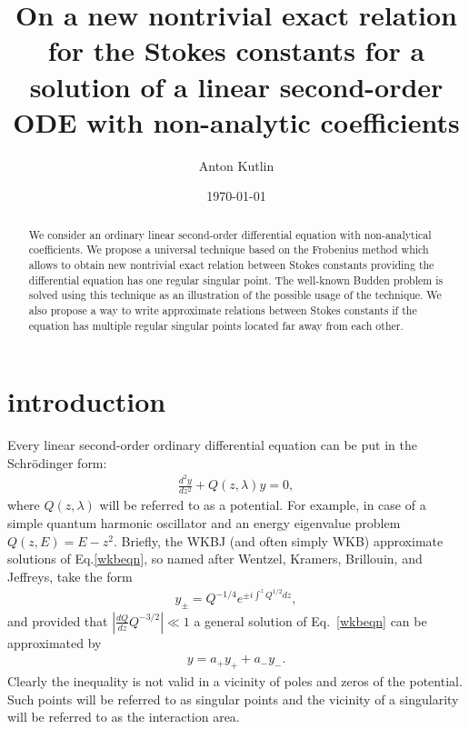 \documentclass[aip,jmp,reprint]{revtex4-1}
\begin{document}
\title{On a new nontrivial exact relation for the Stokes constants for a solution of 
a linear second-order ODE with non-analytic coefficients}
\author{Anton Kutlin}

\date{\today}

\begin{abstract}
We consider an ordinary linear second-order differential equation with non-analytical coefficients.
We propose a universal technique based on the Frobenius method which allows to obtain new nontrivial 
exact relation between Stokes constants providing the differential equation has one regular singular point.
The well-known Budden problem is solved using this technique as an illustration of the possible usage
of the technique. We also propose a way to write approximate relations between Stokes constants 
if the equation has multiple regular singular points located far away from each other.
\end{abstract}


\maketitle

\section{introduction \label{intro}}
Every linear second-order ordinary differential equation can be put in the Schr\"odinger form:
\begin{eqnarray}
\frac{d^2y}{dz^2} + Q(z,\lambda)y = 0,   \label{wkbeqn}
\end{eqnarray}
where \mbox{$Q(z,\lambda)$} will be referred to as a potential. For example, in case of a simple quantum harmonic oscillator and an energy eigenvalue problem \mbox{$Q(z,E)=E-z^2$}. Briefly, the WKBJ (and often simply WKB) 
approximate solutions of Eq.\ref{wkbeqn}, so named after
Wentzel, Kramers, Brillouin, and Jeffreys\cite{wkbj}, take the form
\begin{eqnarray}
y_\pm = Q^{-1/4} e^{\pm i \int^z Q^{1/2} dz},   \label{wkbsol}
\end{eqnarray}
and provided that
$\left|\frac{dQ}{dz}Q^{-3/2}\right| \ll 1 $
a general solution of Eq.~\ref{wkbeqn} can be approximated by
\begin{eqnarray}
y = a_+y_+ + a_-y_-.    \label{gensol}
\end{eqnarray}
Clearly the inequality is not valid in a vicinity of poles and zeros of the potential. Such points will be referred to as singular points and the vicinity of a singularity will be referred to as the interaction area.
\end{document}
